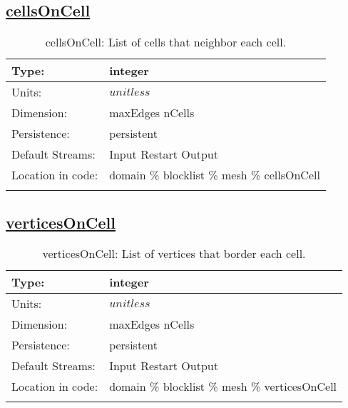 \subsection[cellsOnCell]{\hyperref[sec:var_tab_mesh]{cellsOnCell}}
\label{subsec:var_sec_mesh_cellsOnCell}
\begin{center}
\begin{longtable}{| p{2.0in} | p{4.0in} |}
        \hline 
        Type: & integer \\
        \hline 
        Units: & $unitless$ \\
        \hline 
        Dimension: & maxEdges nCells \\
        \hline 
        Persistence: & persistent \\
        \hline 
		 Default Streams: & Input Restart Output  \\
        \hline 
		 Location in code: & domain \% blocklist \% mesh \% cellsOnCell \\
		 \hline 
    \caption{cellsOnCell: List of cells that neighbor each cell.}
\end{longtable}
\end{center}
\subsection[verticesOnCell]{\hyperref[sec:var_tab_mesh]{verticesOnCell}}
\label{subsec:var_sec_mesh_verticesOnCell}
\begin{center}
\begin{longtable}{| p{2.0in} | p{4.0in} |}
        \hline 
        Type: & integer \\
        \hline 
        Units: & $unitless$ \\
        \hline 
        Dimension: & maxEdges nCells \\
        \hline 
        Persistence: & persistent \\
        \hline 
		 Default Streams: & Input Restart Output  \\
        \hline 
		 Location in code: & domain \% blocklist \% mesh \% verticesOnCell \\
		 \hline 
    \caption{verticesOnCell: List of vertices that border each cell.}
\end{longtable}
\end{center}
